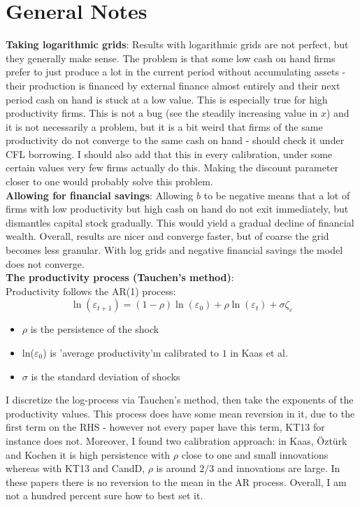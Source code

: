 \documentclass[12pt]{article}
\begin{document}
\newpage

\section*{General Notes}
\textbf{Taking logarithmic grids}: Results with logarithmic grids are not perfect, but they generally make sense. The problem is that some low cash on hand firms prefer to just produce a lot in the current period without accumulating assets - their production is financed by external finance almost entirely and their next period cash on hand is stuck at a low value. This is especially true for high productivity firms. This is not a bug (see the steadily increasing value in $x$) and it is not necessarily a problem, but it is a bit weird that firms of the same productivity do not converge to the same cash on hand - should check it under CFL borrowing. I should also add that this in every calibration, under some certain values very few firms actually do this. Making the discount parameter closer to one would probably solve this problem.   \vspace{3mm} \\
\textbf{Allowing for financial savings}:  Allowing $b$ to be negative means that a lot of firms with low productivity but high cash on hand do not exit immediately, but dismantles capital stock gradually. This would yield a gradual decline of financial wealth. Overall, results are nicer and converge faster, but of coarse the grid becomes less granular. With log grids and negative financial savings the model does not converge.  \vspace{3mm} \\
\textbf{The productivity process (Tauchen's method)}: \\
Productivity follows the AR(1) process:
$$ \ln(\varepsilon_{t+1}) = (1-\rho) \ln(\varepsilon_0) + \rho \ln(\varepsilon_t) + \sigma \zeta_\varepsilon $$
\begin{itemize}\setlength\itemsep{0em} \small
    \item $\rho$ is the persistence of the shock
    \item ln($\varepsilon_0$) is 'average productivity'm calibrated to $1$ in Kaas et al.
    \item $\sigma$ is the standard deviation of shocks
\end{itemize} \normalsize
I discretize the log-process via Tauchen's method, then take the exponents of the productivity values. This process does have some mean reversion in it, due to the first term on the RHS - however not every paper have this term, KT13 for instance does not. Moreover, I found two calibration approach: in Kaas, Öztürk and Kochen it is high persistence with $\rho$ close to one and small innovations whereas with KT13 and CandD, $\rho$ is around $2/3$ and innovations are large. In these papers there is no reversion to the mean in the AR process. Overall, I am not a hundred percent sure how to best set it.  \vspace{3mm} \\
\end{document}
